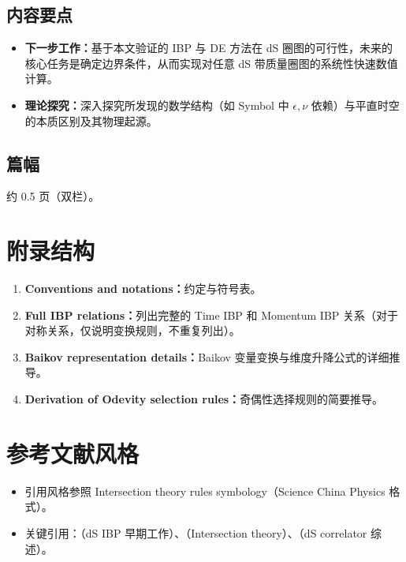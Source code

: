 \documentclass[UTF8,a4paper,11pt]{ctexart}
\begin{document}
\subsection*{内容要点}
\begin{itemize}
  \item \textbf{下一步工作：}基于本文验证的 IBP 与 DE 方法在 dS 圈图的可行性，未来的核心任务是确定边界条件，从而实现对任意 dS 带质量圈图的系统性快速数值计算。
  \item \textbf{理论探究：}深入探究所发现的数学结构（如 Symbol 中 $\epsilon, \nu$ 依赖）与平直时空的本质区别及其物理起源。
\end{itemize}
\subsection*{篇幅}
约 0.5 页（双栏）。

\section*{附录结构}
\begin{enumerate}[label=\Alph*.]
  \item \textbf{Conventions and notations：}约定与符号表。
  \item \textbf{Full IBP relations：}列出完整的 Time IBP 和 Momentum IBP 关系（对于对称关系，仅说明变换规则，不重复列出）。
  \item \textbf{Baikov representation details：}Baikov 变量变换与维度升降公式的详细推导。
  \item \textbf{Derivation of Odevity selection rules：}奇偶性选择规则的简要推导。
\end{enumerate}

\section*{参考文献风格}
\begin{itemize}
  \item 引用风格参照 Intersection theory rules symbology（Science China Physics 格式）。
  \item 关键引用：\cite{}（dS IBP 早期工作）、\cite{}（Intersection theory）、\cite{}（dS correlator 综述）。
\end{itemize}
\end{document}
